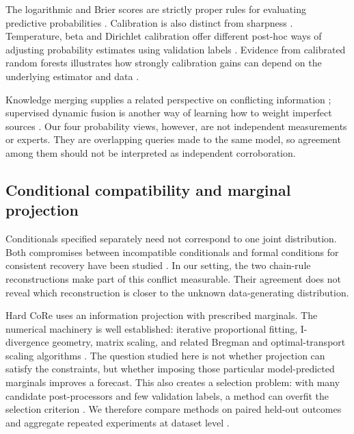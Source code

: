 \documentclass[a4paper,fleqn]{cas-sc}
\begin{document}
The logarithmic and Brier scores are strictly proper rules for evaluating predictive probabilities \citep{brier1950,gneiting2007strictly}. Calibration is also distinct from sharpness \citep{gneiting2007calibration}. Temperature, beta and Dirichlet calibration offer different post-hoc ways of adjusting probability estimates using validation labels \citep{guo2017calibration,kull2017beta,kull2019dirichlet}. Evidence from calibrated random forests illustrates how strongly calibration gains can depend on the underlying estimator and data \citep{shaker2025rfcalibration}.

Knowledge merging supplies a related perspective on conflicting information \citep{hunter2006merging}; supervised dynamic fusion is another way of learning how to weight imperfect sources \citep{zhang2025dynamicfusion}. Our four probability views, however, are not independent measurements or experts. They are overlapping queries made to the same model, so agreement among them should not be interpreted as independent corroboration.

\subsection{Conditional compatibility and marginal projection}
Conditionals specified separately need not correspond to one joint distribution. Both compromises between incompatible conditionals and formal conditions for consistent recovery have been studied \citep{mure2019compromise,majid2025consistent}. In our setting, the two chain-rule reconstructions make part of this conflict measurable. Their agreement does not reveal which reconstruction is closer to the unknown data-generating distribution.

Hard CoRe uses an information projection with prescribed marginals. The numerical machinery is well established: iterative proportional fitting, I-divergence geometry, matrix scaling, and related Bregman and optimal-transport scaling algorithms \citep{deming1940ipf,csiszar1975idiv,sinkhorn1964scaling,cuturi2013sinkhorn,benamou2015bregman,chizat2018scaling}. The question studied here is not whether projection can satisfy the constraints, but whether imposing those particular model-predicted marginals improves a forecast. This also creates a selection problem: with many candidate post-processors and few validation labels, a method can overfit the selection criterion \citep{cawley2010overfitting}. We therefore compare methods on paired held-out outcomes and aggregate repeated experiments at dataset level \citep{demsar2006comparisons}.
\end{document}
